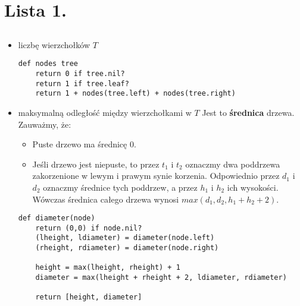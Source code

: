 \documentclass[svgnames]{report}
\begin{document}
%

\chapter{Lista 1.}

\section{}%
\begin{itemize}
\item{liczbę wierzchołków $T$}
\begin{lstlisting}
def nodes tree
	return 0 if tree.nil?
	return 1 if tree.leaf?
	return 1 + nodes(tree.left) + nodes(tree.right)
\end{lstlisting}

\item{maksymalną odległość między wierzchołkami w $T$}
Jest to \textbf{średnica} drzewa.
Zauważmy, że:
\begin{itemize}
\item Puste drzewo ma średnicę $0$.
\item Jeśli drzewo jest niepuste, to przez $t_1$ i $t_2$ oznaczmy dwa poddrzewa zakorzenione w lewym i prawym synie korzenia. Odpowiednio przez $d_1$ i $d_2$ oznaczmy średnice tych poddrzew, a przez $h_1$ i $h_2$ ich wysokości. Wówczas średnica całego drzewa wynosi $max(d_1, d_2, h_1+h_2+2)$.
\end{itemize}
\begin{lstlisting}
def diameter(node) 
	return (0,0) if node.nil? 
	(lheight, ldiameter) = diameter(node.left)
	(rheight, rdiameter) = diameter(node.right)
	
	height = max(lheight, rheight) + 1
	diameter = max(lheight + rheight + 2, ldiameter, rdiameter)

	return [height, diameter]
\end{lstlisting}
\end{itemize}
\end{document}
